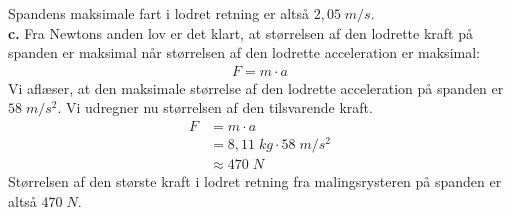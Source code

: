 \documentclass{report}
\begin{document}
Spandens maksimale fart i lodret retning er altså $2,05 \;\unit{m/s} $.\\[1ex]
\textbf{c.}
Fra Newtons anden lov er det klart, at størrelsen af den lodrette kraft på spanden er maksimal når størrelsen af den lodrette acceleration er maksimal:
\begin{equation*}
\begin{split}
  F=m \cdot a
\end{split}
\end{equation*}
Vi aflæser, at den maksimale størrelse af den lodrette acceleration på spanden er $58 \;\unit{m/s^2} $.
Vi udregner nu størrelsen af den tilsvarende kraft.
\begin{equation*}
\begin{split}
  F&=m \cdot a \\
  &=8,11 \;\unit{kg} \cdot 58 \;\unit{m/s^2} \\
  &\approx 470 \;\unit{N} 
\end{split}
\end{equation*}
Størrelsen af den største kraft i lodret retning fra malingsrysteren på spanden er altså $470 \;\unit{N} $.
\end{document}
